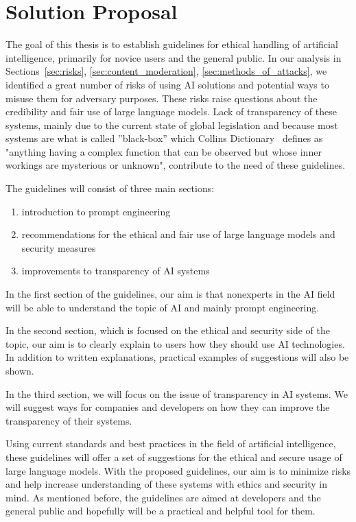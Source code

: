 \chapter{Solution Proposal}

The goal of this thesis is to establish guidelines for ethical handling of artificial intelligence, primarily for novice users and the general public. In our analysis in Sections~\ref{sec:risks}, \ref{sec:content_moderation}, \ref{sec:methods_of_attacks}, we identified a great number of risks of using AI solutions and potential ways to misuse them for adversary purposes. These risks raise questions about the credibility and fair use of large language models. Lack of transparency of these systems, mainly due to the current state of global legislation and because most systems are what is called ''black-box'' which Collins Dictionary~\cite{Collins_BlackBox} defines as "anything having a complex function that can be observed but whose inner workings are mysterious or unknown", contribute to the need of these guidelines.

The guidelines will consist of three main sections:
\begin{enumerate}
    \item introduction to prompt engineering
    \item recommendations for the ethical and fair use of large language models and security measures
    \item improvements to transparency of AI systems %
\end{enumerate}

In the first section of the guidelines, our aim is that nonexperts in the AI field will be able to understand the topic of AI and mainly prompt engineering.

In the second section, which is focused on the ethical and security side of the topic, our aim is to clearly explain to users how they should use AI technologies. In addition to written explanations, practical examples of suggestions will also be shown.

In the third section, we will focus on the issue of transparency in AI systems. We will suggest ways for companies and developers on how they can improve the transparency of their systems.

Using current standards and best practices in the field of artificial intelligence, these guidelines will offer a set of suggestions for the ethical and secure usage of large language models. With the proposed guidelines, our aim is to minimize risks and help increase understanding of these systems with ethics and security in mind. As mentioned before, the guidelines are aimed at developers and the general public and hopefully will be a practical and helpful tool for them.
